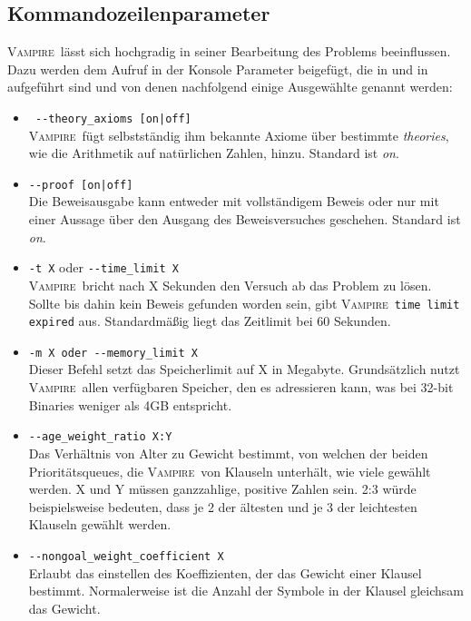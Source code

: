 \documentclass{article}
\newcommand{\vampire}{\textsc{Vampire}~}
\begin{document}
\subsection{Kommandozeilenparameter}
\label{subsec:commands}
\vampire lässt sich hochgradig in seiner Bearbeitung des Problems beeinflussen. Dazu werden dem Aufruf in der Konsole Parameter beigefügt, die in \cite{cav2013} und in \cite[S. 2,20]{hoder2011slides} aufgeführt sind und von denen nachfolgend einige Ausgewählte genannt werden:
\begin{itemize}	
	\item \verb= --theory_axioms [on|off]= \label{arg:theoryaxiomsoff}\\
	\vampire fügt selbstständig ihm bekannte Axiome über bestimmte \emph{theories}, wie die Arithmetik auf natürlichen Zahlen, hinzu. Standard ist \textit{on}.
	\item \verb=--proof [on|off]= \label{arg:proofoff}\\
	Die Beweisausgabe kann entweder mit vollständigem Beweis oder nur mit einer Aussage über den Ausgang des Beweisversuches geschehen. Standard ist \textit{on}.
	\item \verb|-t X| oder \verb|--time_limit X| \label{arg:timelimit}\\
	\vampire bricht nach X Sekunden den Versuch ab das Problem zu lösen. Sollte bis dahin kein Beweis gefunden worden sein, gibt \vampire \texttt{time limit expired} aus. Standardmäßig liegt das Zeitlimit bei 60  Sekunden.
	\item \verb|-m X oder --memory_limit X| \label{arg:memorylimit}\\
	Dieser Befehl setzt das Speicherlimit auf X in Megabyte. Grundsätzlich nutzt \vampire allen verfügbaren Speicher, den es adressieren kann, was bei 32-bit Binaries weniger als 4GB entspricht.
	\item \verb|--age_weight_ratio X:Y| \label{arg:ageweightratio}\\
	Das Verhältnis von Alter zu Gewicht bestimmt, von welchen der beiden Prioritätsqueues, die \vampire von Klauseln unterhält, wie viele gewählt werden. X und Y müssen ganzzahlige, positive Zahlen sein.
	2:3 würde beispielsweise bedeuten, dass je 2 der ältesten und je 3 der leichtesten Klauseln gewählt werden.  
	\item \verb|--nongoal_weight_coefficient X| \label{arg:weightcoefficient}\\
	Erlaubt das einstellen des Koeffizienten, der das Gewicht einer Klausel bestimmt. Normalerweise ist die Anzahl der Symbole in der Klausel gleichsam das Gewicht.

\end{itemize}
\end{document}
